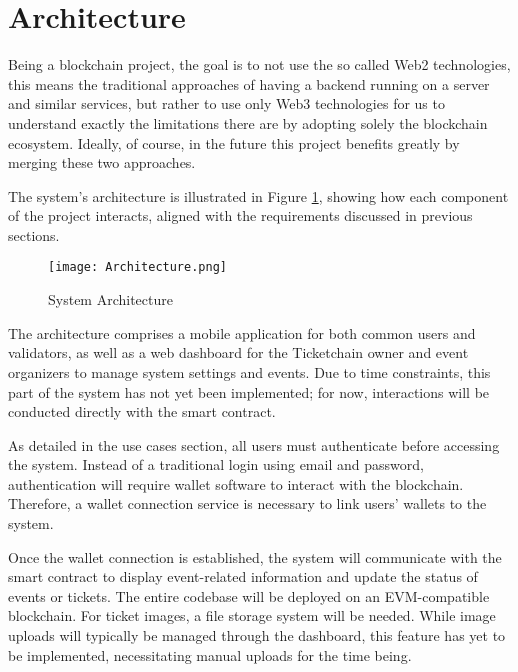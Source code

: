 \section{Architecture}
\label{sec:architecture}

Being a blockchain project, the goal is to not use the so called Web2
technologies, this means the traditional approaches of having a backend running
on a server and similar services, but rather to use only Web3 technologies for
us to understand exactly the limitations there are by adopting solely the
blockchain ecosystem. Ideally, of course, in the future this project benefits
greatly by merging these two approaches.

The system's architecture is illustrated in Figure \ref{fig:architecture},
showing how each component of the project interacts, aligned with the
requirements discussed in previous sections.

\begin{figure}[H]
    \centering
    \texttt{[image: Architecture.png]}
    \caption{System Architecture}
    \label{fig:architecture}
\end{figure}

The architecture comprises a mobile application for both common users and
validators, as well as a web dashboard for the Ticketchain owner and event
organizers to manage system settings and events. Due to time constraints, this
part of the system has not yet been implemented; for now, interactions will be
conducted directly with the smart contract.

As detailed in the use cases section, all users must authenticate before
accessing the system. Instead of a traditional login using email and password,
authentication will require wallet software to interact with the blockchain.
Therefore, a wallet connection service is necessary to link users' wallets to
the system.

Once the wallet connection is established, the system will communicate with the
smart contract to display event-related information and update the status of
events or tickets. The entire codebase will be deployed on an EVM-compatible
blockchain. For ticket images, a file storage system will be needed. While
image uploads will typically be managed through the dashboard, this feature has
yet to be implemented, necessitating manual uploads for the time being.
